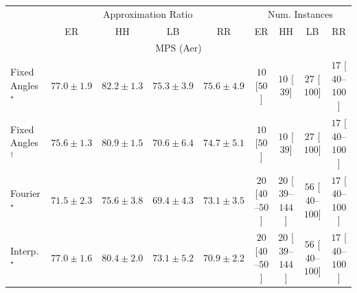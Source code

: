 \begin{tabular}{l|cccc|cccc|}
\toprule
& \multicolumn{4}{c|}{Approximation Ratio} & \multicolumn{4}{c|}{Num. Instances} \\
            & ER & HH & LB & RR & ER & HH & LB & RR \\
\midrule
\multicolumn{9}{c}{\rule{0pt}{8pt}MPS (Aer)} \\
\midrule
Fixed Angles$^\star$ & {\cellcolor[HTML]{8A55A7}} \color[HTML]{F1F1F1} $77.0\pm 1.9$ & {\cellcolor[HTML]{831F86}} \color[HTML]{F1F1F1} $82.2\pm 1.3$ & {\cellcolor[HTML]{8C66AF}} \color[HTML]{F1F1F1} $75.3\pm 3.9$ & {\cellcolor[HTML]{8B62AD}} \color[HTML]{F1F1F1} $75.6\pm 4.9$ & {\cellcolor[HTML]{FFF7F3}} \color[HTML]{000000} $10$ [$50$] & {\cellcolor[HTML]{FFF7F3}} \color[HTML]{000000} $10$ [$39$] & {\cellcolor[HTML]{FFF3EF}} \color[HTML]{000000} $27$ [$100$] & {\cellcolor[HTML]{FFF5F1}} \color[HTML]{000000} $17$ [$40$--$100$] \\
Fixed Angles$^\dagger$ & {\cellcolor[HTML]{8B62AD}} \color[HTML]{F1F1F1} $75.6\pm 1.3$ & {\cellcolor[HTML]{852D90}} \color[HTML]{F1F1F1} $80.9\pm 1.5$ & {\cellcolor[HTML]{8C93C4}} \color[HTML]{F1F1F1} $70.6\pm 6.4$ & {\cellcolor[HTML]{8C6CB1}} \color[HTML]{F1F1F1} $74.7\pm 5.1$ & {\cellcolor[HTML]{FFF7F3}} \color[HTML]{000000} $10$ [$50$] & {\cellcolor[HTML]{FFF7F3}} \color[HTML]{000000} $10$ [$39$] & {\cellcolor[HTML]{FFF3EF}} \color[HTML]{000000} $27$ [$100$] & {\cellcolor[HTML]{FFF5F1}} \color[HTML]{000000} $17$ [$40$--$100$] \\
Fourier$^\star$ & {\cellcolor[HTML]{8C8BC0}} \color[HTML]{F1F1F1} $71.5\pm 2.3$ & {\cellcolor[HTML]{8B62AD}} \color[HTML]{F1F1F1} $75.6\pm 3.8$ & {\cellcolor[HTML]{909ECA}} \color[HTML]{F1F1F1} $69.4\pm 4.3$ & {\cellcolor[HTML]{8C7AB8}} \color[HTML]{F1F1F1} $73.1\pm 3.5$ & {\cellcolor[HTML]{FFF4F0}} \color[HTML]{000000} $20$ [$40$--$50$] & {\cellcolor[HTML]{FFF4F0}} \color[HTML]{000000} $20$ [$39$--$144$] & {\cellcolor[HTML]{FEECE9}} \color[HTML]{000000} $56$ [$40$--$100$] & {\cellcolor[HTML]{FFF5F1}} \color[HTML]{000000} $17$ [$40$--$100$] \\
Interp.$^\star$ & {\cellcolor[HTML]{8A55A7}} \color[HTML]{F1F1F1} $77.0\pm 1.6$ & {\cellcolor[HTML]{863394}} \color[HTML]{F1F1F1} $80.4\pm 2.0$ & {\cellcolor[HTML]{8C7AB8}} \color[HTML]{F1F1F1} $73.1\pm 5.2$ & {\cellcolor[HTML]{8C90C3}} \color[HTML]{F1F1F1} $70.9\pm 2.2$ & {\cellcolor[HTML]{FFF4F0}} \color[HTML]{000000} $20$ [$40$--$50$] & {\cellcolor[HTML]{FFF4F0}} \color[HTML]{000000} $20$ [$39$--$144$] & {\cellcolor[HTML]{FEECE9}} \color[HTML]{000000} $56$ [$40$--$100$] & {\cellcolor[HTML]{FFF5F1}} \color[HTML]{000000} $17$ [$40$--$100$] \\

\end{tabular}
